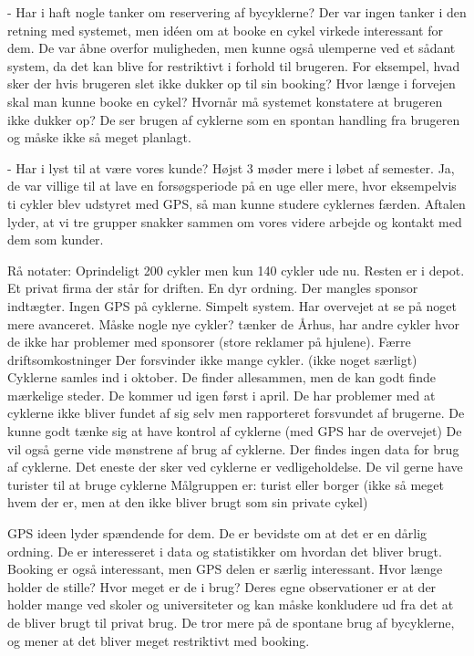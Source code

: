 - Har i haft nogle tanker om reservering af bycyklerne?
Der var ingen tanker i den retning med systemet, men idéen om at booke en cykel virkede interessant for dem. De var åbne overfor
muligheden, men kunne også ulemperne ved et sådant system, da det kan blive for restriktivt i forhold til brugeren.
For eksempel, hvad sker der hvis brugeren slet ikke dukker op til sin booking? Hvor længe i forvejen skal man kunne booke en cykel?
Hvornår må systemet konstatere at brugeren ikke dukker op?
De ser brugen af cyklerne som en spontan handling fra brugeren og måske ikke så meget planlagt.
 
- Har i lyst til at være vores kunde? Højst 3 møder mere i løbet af semester.
Ja, de var villige til at lave en forsøgsperiode på en uge eller mere, hvor eksempelvis ti cykler blev udstyret med GPS, så man kunne
studere cyklernes færden.
Aftalen lyder, at vi tre grupper snakker sammen om vores videre arbejde og kontakt med dem som kunder.

Rå notater:
Oprindeligt 200 cykler men kun 140 cykler ude nu.
Resten er i depot.
Et privat firma der står for driften. En dyr ordning. Der mangles sponsor indtægter.
Ingen GPS på cyklerne. Simpelt system.
Har overvejet at se på noget mere avanceret. Måske nogle nye cykler? tænker de
Århus, har andre cykler hvor de ikke har problemer med sponsorer (store reklamer på hjulene). Færre driftsomkostninger
Der forsvinder ikke mange cykler. (ikke noget særligt)
Cyklerne samles ind i oktober. De finder allesammen, men de kan godt finde mærkelige steder. De kommer ud igen først i april.
De har problemer med at cyklerne ikke bliver fundet af sig selv men rapporteret forsvundet af brugerne.
De kunne godt tænke sig at have kontrol af cyklerne (med GPS har de overvejet)
De vil også gerne vide mønstrene af brug af cyklerne.
Der findes ingen data for brug af cyklerne. Det eneste der sker ved cyklerne er vedligeholdelse.
De vil gerne have turister til at bruge cyklerne
Målgruppen er: turist eller borger (ikke så meget hvem der er, men at den ikke bliver brugt som sin private cykel)

GPS ideen lyder spændende for dem.
De er bevidste om at det er en dårlig ordning.
De er interesseret i data og statistikker om hvordan det bliver brugt.
Booking er også interessant, men GPS delen er særlig interessant.
Hvor længe holder de stille? Hvor meget er de i brug?
Deres egne observationer er at der holder mange ved skoler og universiteter og kan måske konkludere ud fra det at de
bliver brugt til privat brug.
De tror mere på de spontane brug af bycyklerne, og mener at det bliver meget restriktivt med booking.
